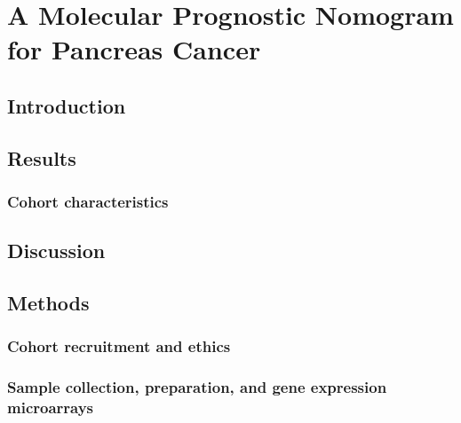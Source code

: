 \documentclass[dissertation.tex]{subfiles}
\begin{document}
\chapter{A Molecular Prognostic Nomogram for Pancreas Cancer}
\label{chap:nomogram}

\section{Introduction}

\section{Results}
\subsection{Cohort characteristics}
\label{subsec:nomo-results-cohort}

\section{Discussion}

\section{Methods}
\subsection{Cohort recruitment and ethics}
\label{subsec:nomo-methods-cohort}

\subsection{Sample collection, preparation, and gene expression microarrays}
\label{subsec:nomo-methods-gex}
\end{document}
